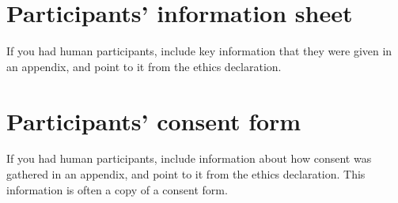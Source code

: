 \documentclass[logo,bsc,singlespacing,parskip,online]{infthesis}
\begin{document}
\chapter{Participants' information sheet}

If you had human participants, include key information that they were given in
an appendix, and point to it from the ethics declaration.

\chapter{Participants' consent form}

If you had human participants, include information about how consent was
gathered in an appendix, and point to it from the ethics declaration.
This information is often a copy of a consent form.
\end{document}
